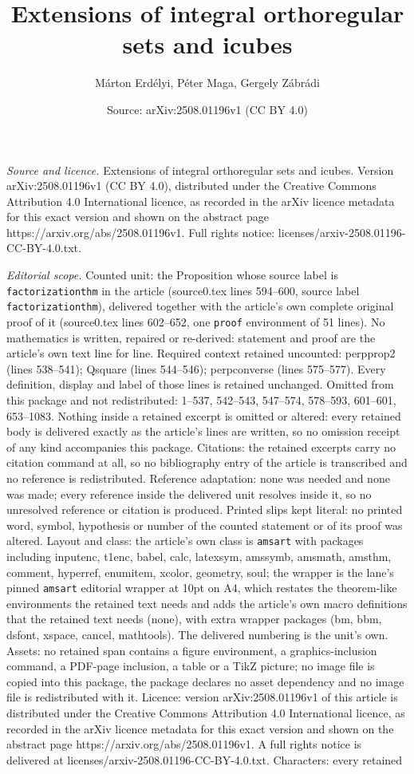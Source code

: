 \documentclass[10pt,a4paper]{amsart}
\title[Extensions of integral orthoregular sets and icubes]{Extensions of integral orthoregular sets and icubes}
\author{M\'arton Erd\'elyi, P\'eter Maga, Gergely Z\'abr\'adi}
\date{Source: arXiv:2508.01196v1 (CC BY 4.0)}
\begin{document}
\maketitle

\noindent\emph{Source and licence.} Extensions of integral orthoregular sets and icubes. Version arXiv:2508.01196v1 (CC BY 4.0), distributed under the Creative Commons Attribution 4.0 International licence, as recorded in the arXiv licence metadata for this exact version and shown on the abstract page https://arxiv.org/abs/2508.01196v1. Full rights notice: licenses/arxiv-2508.01196-CC-BY-4.0.txt.\par\smallskip

\noindent\textit{Editorial scope.} Counted unit: the Proposition whose source label is \texttt{factorizationthm} in the article (source0.tex lines 594--600, source label \texttt{factorizationthm}), delivered together with the article's own complete original proof of it (source0.tex lines 602--652, one \texttt{proof} environment of 51 lines). No mathematics is written, repaired or re-derived: statement and proof are the article's own text line for line. Required context retained uncounted: perpprop2 (lines 538--541); Qsquare (lines 544--546); perpconverse (lines 575--577). Every definition, display and label of those lines is retained unchanged. Omitted from this package and not redistributed: 1--537, 542--543, 547--574, 578--593, 601--601, 653--1083. Nothing inside a retained excerpt is omitted or altered: every retained body is delivered exactly as the article's lines are written, so no omission receipt of any kind accompanies this package. Citations: the retained excerpts carry no citation command at all, so no bibliography entry of the article is transcribed and no reference is redistributed. Reference adaptation: none was needed and none was made; every reference inside the delivered unit resolves inside it, so no unresolved reference or citation is produced. Printed slips kept literal: no printed word, symbol, hypothesis or number of the counted statement or of its proof was altered. Layout and class: the article's own class is \texttt{amsart} with packages including inputenc, t1enc, babel, calc, latexsym, amssymb, amsmath, amsthm, comment, hyperref, enumitem, xcolor, geometry, soul; the wrapper is the lane's pinned \texttt{amsart} editorial wrapper at 10pt on A4, which restates the theorem-like environments the retained text needs and adds the article's own macro definitions that the retained text needs (none), with extra wrapper packages (bm, bbm, dsfont, xspace, cancel, mathtools). The delivered numbering is the unit's own. Assets: no retained span contains a figure environment, a graphics-inclusion command, a PDF-page inclusion, a table or a TikZ picture; no image file is copied into this package, the package declares no asset dependency and no image file is redistributed with it. Licence: version arXiv:2508.01196v1 of this article is distributed under the Creative Commons Attribution 4.0 International licence, as recorded in the arXiv licence metadata for this exact version and shown on the abstract page https://arxiv.org/abs/2508.01196v1. A full rights notice is delivered at licenses/arxiv-2508.01196-CC-BY-4.0.txt. Characters: every retained 
\end{document}
